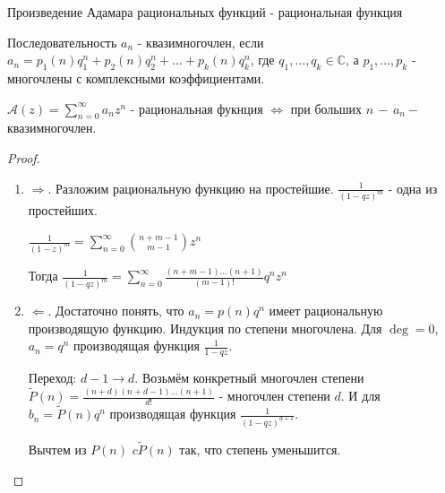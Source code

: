 \begin{theorem}
    Произведение Адамара рациональных функций - рациональная функция
\end{theorem}

\begin{definition}
    Последовательность $a_n$ - квазимногочлен, если $a_n = p_1(n)q_1^n + p_2(n)q_2^n + \ldots + p_k(n)q_k^n$, где
    $q_1, \ldots, q_k \in \mathbb{C}$, а $p_1, \ldots, p_k$ - многочлены с комплексными коэффициентами.
\end{definition}

\begin{lemma}
    $\mathcal{A}(z) = \sum_{n=0}^{\infty} a_nz^n$ - рациональная фукнция $\Leftrightarrow$ при больших $n \, - \, a_n - $ квазимногочлен.
\end{lemma}

\begin{proof}
    \begin{enumerate}
        \item {
            $\Rightarrow$. Разложим рациональную функцию на простейшие. $\frac{1}{(1 - qz)^m}$ - одна из простейших.

            $\frac{1}{(1 - z)^m} = \sum_{n = 0}^{\infty} \binom{n + m - 1}{m - 1} z^n$

            Тогда $\frac{1}{(1 - qz)^m} = \sum_{n = 0}^{\infty} \frac{(n + m - 1) \ldots (n + 1)}{(m - 1)!}q^nz^n$
        }
        \item {
            $\Leftarrow$. Достаточно понять, что $a_n = p(n)q^n$ имеет рациональную производящую функцию. Индукция по степени многочлена.
            Для $\deg = 0$, $a_n =q^n$ производящая функция $\frac{1}{1 - qz}$.

            Переход: $d - 1 \rightarrow d$. Возьмём конкретный многочлен степени $\tilde{P}(n) = \frac{(n + d)(n + d - 1) \ldots (n + 1)}{d!}$ - многочлен степени $d$.
            И для $b_n = \tilde{P}(n)q^n$ производящая функция $\frac{1}{(1 - qz)^{d + 1}}$.

            Вычтем из $P(n)$ $c\tilde{P}(n)$ так, что степень уменьшится.
        }
    \end{enumerate}
\end{proof}

